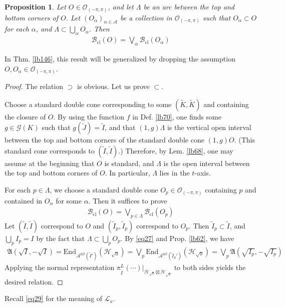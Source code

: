 \documentclass[11pt,b5paper,notitlepage]{article}
\theoremstyle{definition}
\theoremstyle{plain}
\newtheorem{pp}[df]{Proposition}
\newcommand{\fk}{\mathfrak}
\newcommand{\wtd}{\widetilde}
\newcommand{\ovl}{\overline}
\newcommand{\End}{\mathrm{End}} %
\newcommand{\scr}{\mathscr}
\newcommand{\MH}{\mathcal H}
\newcommand{\SG}{\mathscr G}
\newcommand{\Maa}{{\mathcal A^{\otimes 2}}}
\newcommand{\sqz}{{\sqrt 0}}
\newcommand{\Bcl}{\mathcal B_{\mathrm{cl}}}
\newcommand{\Opp}{\mathcal O_{(-\pi,\pi)}}
\newcommand{\SL}{\mathscr L}
\numberwithin{equation}{section}
\begin{document}
\begin{pp}\label{lb71}
Let $O\in\Opp$, and let $\Lambda$ be an arc between the top and bottom corners of $O$. Let $(O_\alpha)_{\alpha\in\scr A}$ be a collection in $\Opp$ such that $O_\alpha\subset O$ for each $\alpha$, and $\Lambda\subset\bigcup_\alpha O_\alpha$. Then
\begin{align}
\Bcl(O)=\bigvee_\alpha\Bcl(O_\alpha)
\end{align}
\end{pp}

In Thm. \ref{lb146}, this result will be generalized by dropping the assumption $O,O_\alpha\in\Opp$.



\begin{proof}
The relation $\supset$ is obvious. Let us prove $\subset$.

Choose a standard double cone corresponding to some $(\wtd K,\wtd K)$ and containing the closure of $O$. By using the function $f$ in Def. \ref{lb70}, one finds some $g\in\SG(K)$ such that $g(\wtd J)=\wtd I$, and that $(1,g)\Lambda$ is the vertical open interval between the top and bottom corners of the standard double cone $(1,g)O$. (This standard cone corresponds to $(\wtd I,\wtd I)$.) Therefore, by Lem. \ref{lb68}, one may assume at the beginning that $O$ is standard, and $\Lambda$ is the open interval between the top and bottom corners of $O$. In particular, $\Lambda$ lies in the $t$-axis.


For each $p\in\Lambda$, we choose a standard double cone $O_p\in\Opp$ containing $p$ and contained in $O_\alpha$ for some $\alpha$. Then it suffices to prove
\begin{align*}
\Bcl(O)=\bigvee_{p\in\Lambda}\Bcl(O_p)
\end{align*}
Let $(\wtd I,\wtd I)$ correspond to $O$ and $(\wtd I_p,\wtd I_p)$ correspond to $O_p$. Then $\wtd I_p\subset \wtd I$, and $\bigcup_p I_p=I$ by the fact that $\Lambda\subset\bigcup_p O_p$. By \eqref{eq27} and Prop. \ref{lb62}, we have
\begin{align*}
\fk A(\sqrt I,-\sqrt I)=\End_{\Maa(\wtd I')}(\MH_\sqz)=\bigvee_p \End_{\Maa(\wtd I_p')}(\MH_\sqz) =\bigvee_p\fk A(\sqrt{I_p},-\sqrt{I_p})
\end{align*}
Applying the normal representation $\pi^L_{\wtd I}(\cdots)|_{\MH_\sqz\boxtimes\MH_{\ovl\sqz}}$ to both sides yields the desired relation.
\end{proof}


Recall \eqref{eq29} for the meaning of $\SL_x$.
\end{document}
